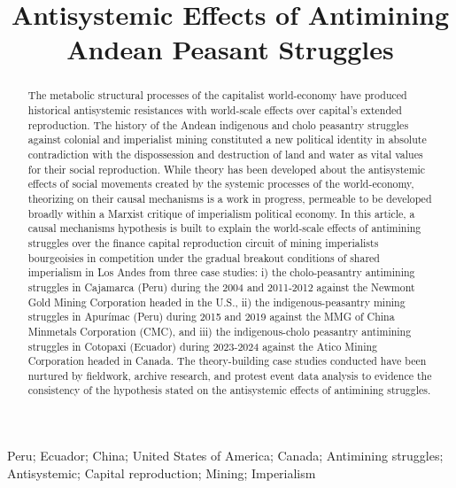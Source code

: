\documentclass[]{interact}
\theoremstyle{plain}%
\theoremstyle{definition}
\theoremstyle{remark}
\begin{document}
\title{Antisystemic Effects of Antimining Andean Peasant Struggles}

\maketitle

\begin{abstract}
The metabolic structural processes of the capitalist world-economy have produced historical antisystemic resistances with world-scale effects over capital's extended reproduction. The history of the Andean indigenous and cholo peasantry struggles against colonial and imperialist mining constituted a new political identity in absolute contradiction with the dispossession and destruction of land and water as vital values for their social reproduction. While theory has been developed about the antisystemic effects of social movements created by the systemic processes of the world-economy, theorizing on their causal mechanisms is a work in progress, permeable to be developed broadly within a Marxist critique of imperialism political economy. In this article, a causal mechanisms hypothesis is built to explain the world-scale effects of antimining struggles over the finance capital reproduction circuit of mining imperialists bourgeoisies in competition under the gradual breakout conditions of shared imperialism in Los Andes from three case studies: i) the cholo-peasantry antimining struggles in Cajamarca (Peru) during the 2004 and 2011-2012 against the Newmont Gold Mining Corporation headed in the U.S., ii) the indigenous-peasantry mining struggles in Apurímac (Peru) during 2015 and 2019 against the MMG of China Minmetals Corporation (CMC), and iii) the indigenous-cholo peasantry antimining struggles in Cotopaxi (Ecuador) during 2023-2024 against the Atico Mining Corporation headed in Canada. The theory-building case studies conducted have been nurtured by fieldwork, archive research, and protest event data analysis to evidence the consistency of the hypothesis stated on the antisystemic effects of antimining struggles.
\end{abstract}

\begin{keywords}
Peru; Ecuador; China; United States of America; Canada; Antimining struggles; Antisystemic; Capital reproduction; Mining; Imperialism 
\end{keywords}
\end{document}
